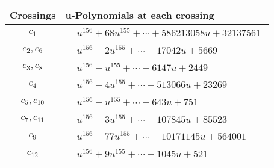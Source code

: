 \documentclass[1p]{elsarticle_modified}
\theoremstyle{definition}
\begin{document}
\begin{tabular}{m{50pt}|m{274pt}}
Crossings & \hspace{64pt}u-Polynomials at each crossing \\
\hline $$\begin{aligned}c_{1}\end{aligned}$$&$\begin{aligned}
&u^{156}+68 u^{155}+\cdots+586213058 u+32137561
\end{aligned}$\\
\hline $$\begin{aligned}c_{2},c_{6}\end{aligned}$$&$\begin{aligned}
&u^{156}-2 u^{155}+\cdots-17042 u+5669
\end{aligned}$\\
\hline $$\begin{aligned}c_{3},c_{8}\end{aligned}$$&$\begin{aligned}
&u^{156}- u^{155}+\cdots+6147 u+2449
\end{aligned}$\\
\hline $$\begin{aligned}c_{4}\end{aligned}$$&$\begin{aligned}
&u^{156}-4 u^{155}+\cdots-513066 u+23269
\end{aligned}$\\
\hline $$\begin{aligned}c_{5},c_{10}\end{aligned}$$&$\begin{aligned}
&u^{156}- u^{155}+\cdots+643 u+751
\end{aligned}$\\
\hline $$\begin{aligned}c_{7},c_{11}\end{aligned}$$&$\begin{aligned}
&u^{156}-3 u^{155}+\cdots+107845 u+85523
\end{aligned}$\\
\hline $$\begin{aligned}c_{9}\end{aligned}$$&$\begin{aligned}
&u^{156}-77 u^{155}+\cdots-10171145 u+564001
\end{aligned}$\\
\hline $$\begin{aligned}c_{12}\end{aligned}$$&$\begin{aligned}
&u^{156}+9 u^{155}+\cdots-1045 u+521
\end{aligned}$\\
\hline
\end{tabular}\\~\\
\end{document}
